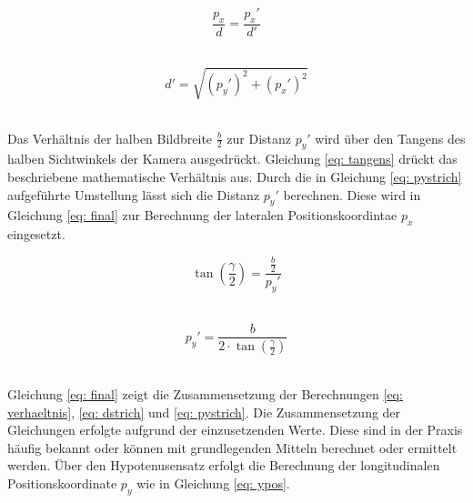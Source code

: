 		
		\begin{figure}[H]
			\centering
			\begin{minipage}[b]{0.49\textwidth}
				\begin{equation}
					\frac{p_x}{d}=\frac{{p_x}'}{d'}
					\label{eq: verhaeltnis}
				\end{equation}\\
			\end{minipage}
			\hfill
			\begin{minipage}[b]{0.49\textwidth}
				\begin{equation}
					d'=\sqrt{({p_y}')^2+({p_x}')^2}
					\label{eq: dstrich}
				\end{equation}\\
			\end{minipage}
		\end{figure}
		
		Das Verhältnis der halben Bildbreite $\frac{b}{2}$ zur Distanz ${p_y}'$ wird über den Tangens des halben Sichtwinkels der Kamera ausgedrückt. Gleichung \ref{eq: tangens} drückt das beschriebene mathematische Verhältnis aus. Durch die in Gleichung \ref{eq: pystrich} aufgeführte Umstellung lässt sich die Distanz ${p_y}'$ berechnen. Diese wird in Gleichung \ref{eq: final} zur Berechnung der lateralen Positionskoordintae $p_x$ eingesetzt.\\
		
		\begin{figure}[H]
			\centering
			\begin{minipage}[b]{0.49\textwidth}
				\begin{equation}
					\tan\left(\frac{\gamma}{2}\right)=\frac{\frac{b}{2}}{{p_y}'}
					\label{eq: tangens}
				\end{equation}\\
			\end{minipage}
			\hfill
			\begin{minipage}[b]{0.49\textwidth}
				\begin{equation}
					{p_y}'=\frac{b}{2\cdot \tan\left(\frac{\gamma}{2}\right)}
					\label{eq: pystrich}
				\end{equation}\\
			\end{minipage}
		\end{figure}
	
		Gleichung \ref{eq: final} zeigt die Zusammensetzung der Berechnungen \ref{eq: verhaeltnis}, \ref{eq: dstrich} und \ref{eq: pystrich}. Die Zusammensetzung der Gleichungen erfolgte aufgrund der einzusetzenden Werte. Diese sind in der Praxis häufig bekannt oder können mit grundlegenden Mitteln berechnet oder ermittelt werden. Über den Hypotenusensatz erfolgt die Berechnung der longitudinalen Positionskoordinate $p_y$ wie in Gleichung \ref{eq: ypos}.\\		
	
